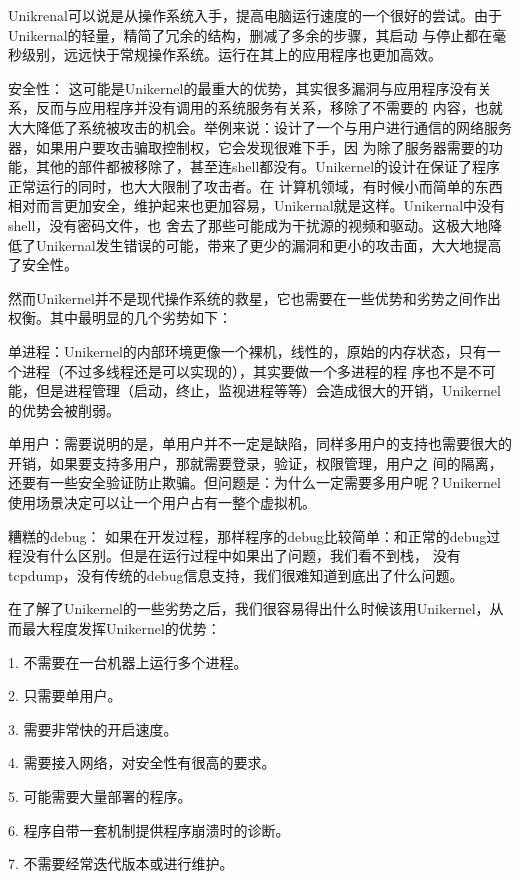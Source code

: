 \documentclass[fontsize=13pt, %
    paper=a4, %
    twoside, %
    captions=tableheading,
    index=totoc,
    hyperref]{labbook}
\begin{document}
\begin{spacing}{1.0}
\begin{addmargin}[4cm]{0cm}
Unikrenal可以说是从操作系统入手，提高电脑运行速度的一个很好的尝试。由于Unikernal的轻量，精简了冗余的结构，删减了多余的步骤，其启动
与停止都在毫秒级别，远远快于常规操作系统。运行在其上的应用程序也更加高效。

安全性： 这可能是Unikernel的最重大的优势，其实很多漏洞与应用程序没有关系，反而与应用程序并没有调用的系统服务有关系，移除了不需要的
内容，也就大大降低了系统被攻击的机会。举例来说：设计了一个与用户进行通信的网络服务器，如果用户要攻击骗取控制权，它会发现很难下手，因
为除了服务器需要的功能，其他的部件都被移除了，甚至连shell都没有。Unikernel的设计在保证了程序正常运行的同时，也大大限制了攻击者。在
计算机领域，有时候小而简单的东西相对而言更加安全，维护起来也更加容易，Unikernal就是这样。Unikernal中没有shell，没有密码文件，也
舍去了那些可能成为干扰源的视频和驱动。这极大地降低了Unikernal发生错误的可能，带来了更少的漏洞和更小的攻击面，大大地提高了安全性。

然而Unikernel并不是现代操作系统的救星，它也需要在一些优势和劣势之间作出权衡。其中最明显的几个劣势如下：

单进程：Unikernel的内部环境更像一个裸机，线性的，原始的内存状态，只有一个进程（不过多线程还是可以实现的），其实要做一个多进程的程
序也不是不可能，但是进程管理（启动，终止，监视进程等等）会造成很大的开销，Unikernel的优势会被削弱。

单用户：需要说明的是，单用户并不一定是缺陷，同样多用户的支持也需要很大的开销，如果要支持多用户，那就需要登录，验证，权限管理，用户之
间的隔离，还要有一些安全验证防止欺骗。但问题是：为什么一定需要多用户呢？Unikernel使用场景决定可以让一个用户占有一整个虚拟机。

糟糕的debug： 如果在开发过程，那样程序的debug比较简单：和正常的debug过程没有什么区别。但是在运行过程中如果出了问题，我们看不到栈，
没有tcpdump，没有传统的debug信息支持，我们很难知道到底出了什么问题。


在了解了Unikernel的一些劣势之后，我们很容易得出什么时候该用Unikernel，从而最大程度发挥Unikernel的优势：

1. 不需要在一台机器上运行多个进程。

2. 只需要单用户。

3. 需要非常快的开启速度。

4. 需要接入网络，对安全性有很高的要求。

5. 可能需要大量部署的程序。

6. 程序自带一套机制提供程序崩溃时的诊断。

7. 不需要经常迭代版本或进行维护。


\end{addmargin}
\end{spacing}
\end{document}
